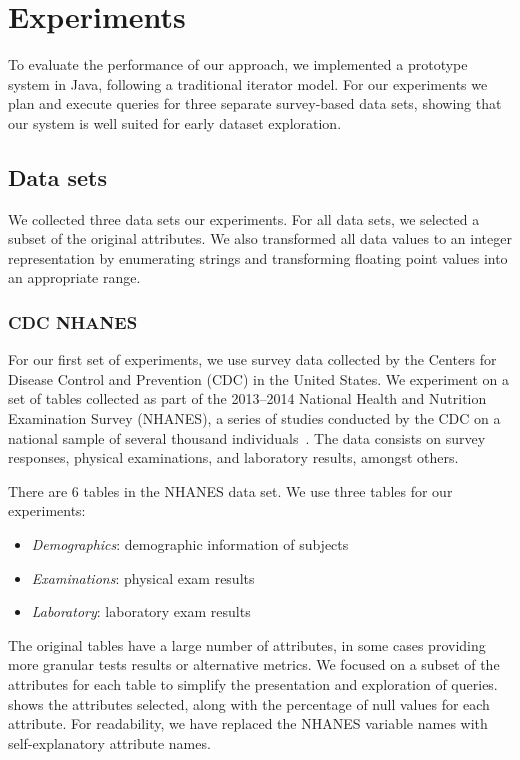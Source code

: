 \section{Experiments}\label{sec:experiments}
To evaluate the performance of our approach,  we implemented
a prototype system in Java, following a traditional iterator model.
For our experiments we plan and execute queries
for three separate survey-based data sets, showing that our system
is well suited for early dataset exploration.

\subsection{Data sets}\label{subsec:datasets}
We collected three data sets our experiments.
For all data sets, we selected a subset of the original attributes.
We also transformed all data values to an integer representation by enumerating strings and transforming floating point values into an appropriate range.

\subsubsection{CDC NHANES}
For our first set of experiments, we use survey data collected by the 
Centers for Disease Control and Prevention (CDC) in the United States. We
experiment on a set of tables collected as part of the 2013--2014 National
Health and Nutrition Examination Survey (NHANES), a series of studies
conducted by the CDC on a national sample of several thousand individuals~\cite{cdc-data}.
The data consists on survey responses, physical examinations, and laboratory
results, amongst others.

There are 6 tables in the NHANES data set. We use three tables for our experiments:

\begin{itemize}
	\item \emph{Demographics}: demographic information of subjects
	\item \emph{Examinations}: physical exam results
	\item \emph{Laboratory}: laboratory exam results
\end{itemize}

The original tables have a large number of attributes, in some cases providing more granular tests results or alternative metrics.
We focused on a subset of the attributes for each table to simplify the presentation and exploration of queries.
 shows the attributes selected, along with the percentage of null values for each attribute.
For readability, we have replaced the NHANES variable names with self-explanatory attribute names.

